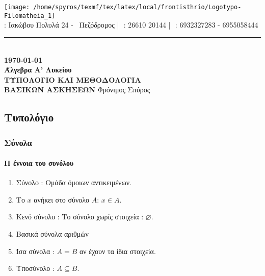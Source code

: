 \documentclass[a4paper,11pt]{article}
\begin{document}
\begin{center}
\texttt{[image: /home/spyros/texmf/tex/latex/local/frontisthrio/Logotypo-Filomatheia\_1]}\\
\vspace{-1mm}
{} : Ιακώβου Πολυλά 24 - \ Πεζόδρομος\,\,|\,\,{} : 26610 20144\,\,|\,\, {} : 6932327283 - 6955058444\\
\rule{14.7cm}{.1mm}\\
\vspace{2mm}
{\bf\today}\\
\vspace{3cm}
{\Huge \textbf{Άλγεβρα Α' Λυκείου}}\\
\vspace*{3cm}
{{\LARGE }\textbf{ΤΥΠΟΛΟΓΙΟ ΚΑΙ ΜΕΘΟΔΟΛΟΓΙΑ}\\[2mm]\textbf{ΒΑΣΙΚΩΝ ΑΣΚΗΣΕΩΝ}}
\vspace*{\fill}
\vfil
Φρόνιμος Σπύρος
\end{center}
\newpage
\null
\newpage
{}
\begin{center}
\part{Τυπολόγιο}
\end{center}
\section{Σύνολα}
\subsection{Η έννοια του συνόλου}
\begin{enumerate}[label=\thesection.\arabic*]
\item Σύνολο : Ομάδα όμοιων αντικειμένων.
\item Το $ x $ ανήκει στο σύνολο $ A $: $ x\in A $.
\item Κενό σύνολο : Το σύνολο χωρίς στοιχεία : $ \varnothing $.
\item Βασικά σύνολα αριθμών
\item Ίσα σύνολα : $ A=B $ αν έχουν τα ίδια στοιχεία. 
\item Υποσύνολο : $ A\subseteq B $.
\end{enumerate}
\end{document}
